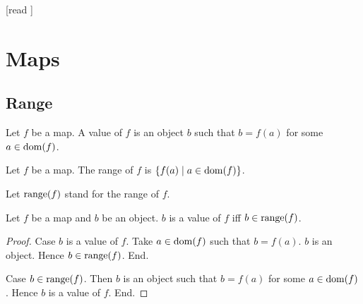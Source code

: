 \documentclass[10pt]{article}
\begin{document}
  \begin{imports}
    \begin{forthel}
      [read ]
    \end{forthel}
  \end{imports}


  \section*{Maps}

  \subsection*{Range}

  \begin{forthel}
    \begin{definition}[id=FOUNDATIONS_06_4284980337311744,printid]
      Let $f$ be a map.
      A value of $f$ is an object $b$ such that $b = f(a)$ for some $a \in \operatorname{dom}(f)$.
    \end{definition}
  \end{forthel}

  \begin{forthel}
    \begin{definition}[id=FOUNDATIONS_06_1938831225913344,printid]
      Let $f$ be a map.
      The range of $f$ is $\{ f(a) \mid a \in \operatorname{dom}(f) \}$.
    \end{definition}

    Let $\textrm{range}(f)$ stand for the range of $f$.
  \end{forthel}

  \begin{forthel}
    \begin{proposition}[id=FOUNDATIONS_06_6386349418479616,printid]
      Let $f$ be a map and $b$ be an object.
      $b$ is a value of $f$ iff $b \in \textrm{range}(f)$.
    \end{proposition}
    \begin{proof}
      Case $b$ is a value of $f$.
        Take $a \in \operatorname{dom}(f)$ such that $b = f(a)$.
        $b$ is an object.
        Hence $b \in \textrm{range}(f)$.
      End.

      Case $b \in \textrm{range}(f)$.
        Then $b$ is an object such that $b = f(a)$ for some $a \in \operatorname{dom}(f)$.
        Hence $b$ is a value of $f$.
      End.
    \end{proof}
  \end{forthel}
\end{document}
